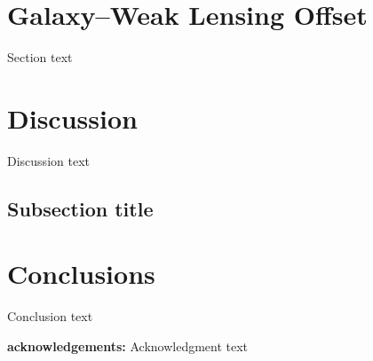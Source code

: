 \section{Galaxy--Weak Lensing Offset}

Section text

\section{Discussion}

Discussion text

\subsection{Subsection title}

\section{Conclusions}

Conclusion text

\textbf{acknowledgements:}
Acknowledgment text

%



%
%  
